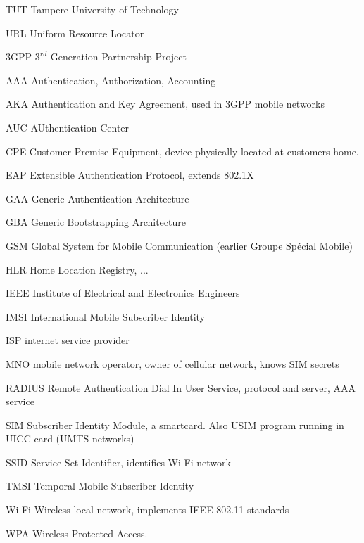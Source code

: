 \documentclass[12pt,a4paper,english]{tutthesis}
\begin{document}
\begin{otherlanguage}{english}
\begin{termlist}
\item [TUT]    Tampere University of Technology
\item [URL]    Uniform Resource Locator
\item[3GPP] $3^{rd}$ Generation Partnership Project
\item[AAA] Authentication, Authorization, Accounting
\item[AKA] Authentication and Key Agreement, used in 3GPP mobile networks 
\item[AUC] AUthentication Center
\item[CPE] Customer Premise Equipment, device physically located at customers home.
\item[EAP] Extensible Authentication Protocol, extends 802.1X
\item[GAA] Generic Authentication Architecture %
\item[GBA] Generic Bootstrapping Architecture
\item[GSM] Global System for Mobile Communication (earlier Groupe Spécial Mobile)
\item[HLR] Home Location Registry, ...
\item[IEEE] Institute of Electrical and Electronics Engineers
\item[IMSI] International Mobile Subscriber Identity
\item[ISP] internet service provider
\item[MNO] mobile network operator, owner of cellular network, knows SIM secrets
\item[RADIUS] Remote Authentication Dial In User Service, protocol and server,  AAA service 
\item[SIM]  Subscriber Identity Module, a smartcard. Also USIM program running in UICC card (UMTS networks)
\item[SSID] Service Set Identifier, identifies Wi-Fi network
\item[TMSI] Temporal Mobile Subscriber Identity
\item[Wi-Fi] Wireless local network, implements IEEE 802.11 standards
\item[WPA] Wireless Protected Access.
\end{termlist} 



\end{otherlanguage}
\end{document}
